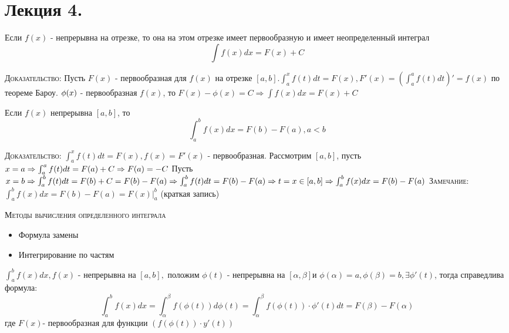 \chapter{Лекция 4.}
    \begin{theorem}
        Если $f(x)$ - непрерывна на отрезке, то она на этом отрезке имеет первообразную и имеет неопределенный интеграл $$\int f(x) dx = F(x) + C$$

        \textsc{Доказательство:} Пусть $F(x)$ - первообразная для $f(x)$ на отрезке $[a,b]. \int_a^x f(t) dt = F(x), F'(x) = (\int^a_a f(t) dt)' = f(x) $ по теореме Бароу. 
        $ \\ \phi(x) $ - первообразная $f(x)$, то $F(x) - \phi(x) = C \Rightarrow \int f(x)dx = F(x) + C$

    \end{theorem}

    \begin{theorem}
        Если $f(x)$ непрерывна $[a,b]$, то $$\int^b_a f(x)dx = F(b) - F(a), a<b$$

        \textsc{Доказательство:}
            $\int^x_a f(t)dt = F(x), f(x) = F'(x)$ - первообразная. Рассмотрим $[a,b]$, пусть $x=a \Rightarrow \int^a_a f(t)dt = F(a) + C \Rightarrow F(a) = -C \\$
            Пусть $x = b \Rightarrow \int^b_a f(t) dt = F(b) + C = F(b)-F(a) \Rightarrow \int^b_a f(t)dt = F(b) - F(a) \Rightarrow t = x \in [a,b] \Rightarrow \int^b_a f(x)dx = F(b) - F(a) \\ $
        \textsc{Замечание:} $\int^b_a f(x)dx = F(b) - F(a) = F(x)|^b_a$ (краткая запись)

    \end{theorem}

    \textsc{Методы вычисления определенного интеграла}
    \begin{itemize}
        \item Формула замены
        \item Интегрирование по частям
    \end{itemize}

    \begin{theorem}
        $\int^b_a f(x)dx , f(x)$ - непрерывна на $[a,b], $ положим $\phi(t)$ - непрерывна на $[\alpha, \beta]$и $\phi(\alpha) = a, \phi(\beta) = b, \exists \phi'(t)$, тогда справедлива формула:
        $$
            \int^b_a f(x)dx = \int^{\beta}_{\alpha} f(\phi(t)) d\phi(t) = \int^{\beta}_{\alpha} f(\phi(t))\cdot \phi'(t) dt = F(\beta) - F(\alpha)$$ где $F(x)$- первообразная для функции $(f(\phi(t))\cdot y'(t))$
    \end{theorem}

